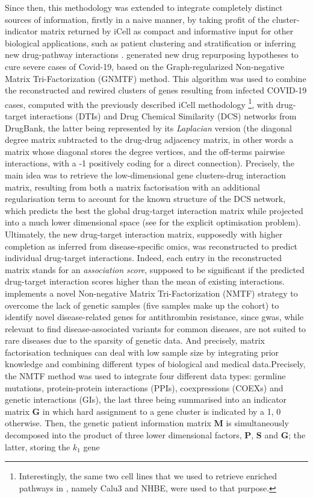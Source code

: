 Since then, this methodology was extended to integrate completely distinct sources of information, firstly in a naive manner, by taking profit of the cluster-indicator matrix returned by iCell as compact and informative input for other biological applications, such as patient clustering and stratification \autocite{xenos_etal23} or inferring new drug-pathway interactions \autocite{malod-dognin_etal23}. \autocite{malod-dognin_etal23} generated new drug repurposing hypotheses to cure severe cases of Covid-19, based on the Graph-regularized Non-negative Matrix Tri-Factorization (GNMTF) method. This algorithm was used to combine the reconstructed and rewired clusters of genes resulting from infected COVID-19 cases, computed with the previously described iCell methodology \footnote{Interestingly, the same two cell lines that we used to retrieve enriched pathways in \autocite{desvaux_etal21}, namely Calu3 and NHBE, were used to that purpose.}, with drug-target interactions (DTIs) and Drug Chemical Similarity (DCS) networks from DrugBank, the latter being represented by its \emph{Laplacian} version (the diagonal degree matrix subtracted to the drug-drug adjacency matrix, in other words a matrix whose diagonal stores the degree vertices, and the off-terms pairwise interactions, with a -1 positively coding for a direct connection). Precisely, the main idea was to retrieve the low-dimensional gene clusters-drug interaction matrix, resulting from both a matrix factorisation with an additional regularisation term to account for the known structure of the DCS network, which predicts the best the global drug-target interaction matrix while projected into a much lower dimensional space (see \autocite[Eq 1.]{malod-dognin_etal23} for the explicit optimisation problem). Ultimately, the new drug-target interaction matrix, supposedly with higher completion as inferred from disease-specific omics, was reconstructed to predict individual drug-target interactions. Indeed, each entry in the reconstructed matrix stands for an \emph{association score}, supposed to be significant if the predicted drug-target interaction scores higher than the mean of existing interactions. \autocite{xenos_etal23} implements a novel Non-negative Matrix Tri-Factorization (NMTF) strategy to overcome the lack of genetic samples (five samples make up the cohort) to identify novel disease-related genes for antithrombin resistance, since \acrshort{gwas}, while relevant to find disease-associated variants for common diseases, are not suited to rare diseases due to the sparsity of genetic data. And precisely, matrix factorisation techniques can deal with low sample size by integrating prior knowledge and combining different types of biological and medical data.Precisely, the NMTF method was used to integrate four different data types: germline mutations, protein-protein interactions (PPIs), coexpressions (COEXs) and genetic interactions (GIs), the last three being summarised into an indicator matrix $\boldsymbol{G}$ in which hard assignment to a gene cluster is indicated by a 1, 0 otherwise. Then, the genetic patient information matrix $\boldsymbol{M}$ is simultaneously decomposed into the product of three lower dimensional factors, $\boldsymbol{P}$, $\boldsymbol{S}$ and $\boldsymbol{G}$; the latter, storing the $k_1$ gene 